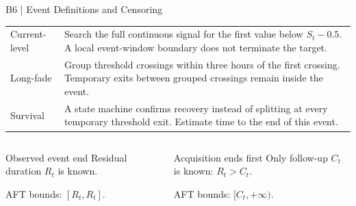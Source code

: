 \begin{frame}[noframenumbering]{B6 | Event Definitions and Censoring}
\small
\renewcommand{\arraystretch}{1.4}
\begin{tabularx}{\textwidth}{@{}p{29mm}X@{}}
\toprule
Current-level & Search the full continuous signal for the first value below $S_t-0.5$. A local event-window boundary does not terminate the target.\\
Long-fade & Group threshold crossings within three hours of the first crossing. Temporary exits between grouped crossings remain inside the event.\\
Survival & A state machine confirms recovery instead of splitting at every temporary threshold exit. Estimate time to the end of this event.\\
\bottomrule
\end{tabularx}
\vspace{3mm}
\begin{columns}[T,onlytextwidth]
\begin{block}{Observed event end}
Residual duration $R_t$ is known.\par
AFT bounds: $[R_t,R_t]$.
\end{block}
\begin{block}{Acquisition ends first}
Only follow-up $C_t$ is known: $R_t>C_t$.\par
AFT bounds: $[C_t,+\infty)$.
\end{block}
\end{columns}
\end{frame}

